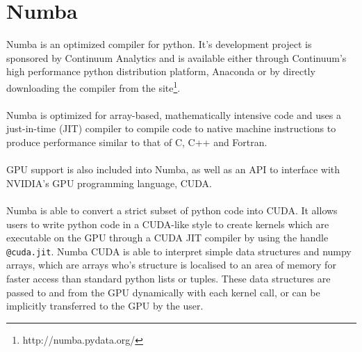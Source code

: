 \section{Numba}
Numba is an optimized compiler for python. It's development project is sponsored by Continuum Analytics and is available either through Continuum's high performance python distribution platform, Anaconda or by directly downloading the compiler from the site\footnote{http://numba.pydata.org/}.
\\
\\
Numba is optimized for array-based, mathematically intensive code and uses a just-in-time (JIT) compiler to compile code to native machine instructions to produce performance similar to that of C, C++ and Fortran.
\\
\\
GPU support is also included into Numba, as well as an API to interface with NVIDIA's GPU programming language, CUDA.
\\
\\
Numba is able to convert a strict subset of python code into CUDA. It allows users to write python code in a CUDA-like style to create kernels which are executable on the GPU through a CUDA JIT compiler by using the handle \texttt{@cuda.jit}. Numba CUDA is able to interpret simple data structures and numpy arrays, which are arrays who's structure is localised to an area of memory for faster access than standard python lists or tuples. These data structures are passed to and from the GPU dynamically with each kernel call, or can be implicitly transferred to the GPU by the user.